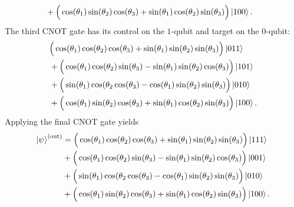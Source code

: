 \documentclass[reqno]{amsart}
\numberwithin{lemma}{section}
\numberwithin{proposition}{section}
\newcommand{\out}{\textnormal{out}}
\begin{document}
{\begin{align*}
& + \Big ( \cos(\theta_{1}) \sin(\theta_{2}) \cos(\theta_{3}) + \sin(\theta_{1}) \cos(\theta_{2}) \sin(\theta_{3}) \Big ) \ket{100}.
\end{align*}
The third CNOT gate has its control on the $1$-qubit and target on the $0$-qubit:
\begin{align*}
& \Big ( \cos(\theta_{1}) \cos(\theta_{2}) \cos(\theta_{3}) + \sin(\theta_{1}) \sin(\theta_{2}) \sin(\theta_{3}) \Big ) \ket{011}\\
& + \Big (\cos(\theta_{1}) \cos(\theta_{2}) \sin(\theta_{3}) - \sin(\theta_{1}) \sin(\theta_{2}) \cos(\theta_{3}) \Big ) \ket{101}\\
& + \Big ( \sin(\theta_{1}) \cos(\theta_{2} \cos(\theta_{3}) - \cos(\theta_{1}) \sin(\theta_{2}) \sin(\theta_{3}) \Big ) \ket{010}\\
& + \Big ( \cos(\theta_{1}) \sin(\theta_{2}) \cos(\theta_{3}) + \sin(\theta_{1}) \cos(\theta_{2}) \sin(\theta_{3}) \Big ) \ket{100}.
\end{align*}
Applying the final CNOT gate yields
\begin{align*}
\ket{\psi}^{(\out)} &= \Big ( \cos(\theta_{1}) \cos(\theta_{2}) \cos(\theta_{3}) + \sin(\theta_{1}) \sin(\theta_{2}) \sin(\theta_{3}) \Big ) \ket{111}\\
& + \Big (\cos(\theta_{1}) \cos(\theta_{2}) \sin(\theta_{3}) - \sin(\theta_{1}) \sin(\theta_{2}) \cos(\theta_{3}) \Big ) \ket{001}\\
& + \Big ( \sin(\theta_{1}) \cos(\theta_{2} \cos(\theta_{3}) - \cos(\theta_{1}) \sin(\theta_{2}) \sin(\theta_{3}) \Big ) \ket{010}\\
& + \Big ( \cos(\theta_{1}) \sin(\theta_{2}) \cos(\theta_{3}) + \sin(\theta_{1}) \cos(\theta_{2}) \sin(\theta_{3}) \Big ) \ket{100}.
\end{align*}

}
\end{document}

